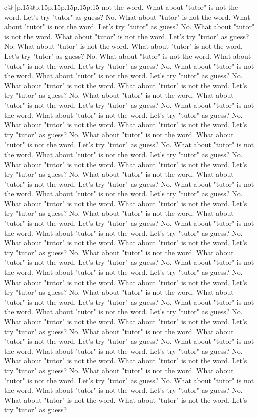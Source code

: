 \documentclass{article}
\begin{document}
{\begin{supertabular}{c@{$\;$}|p{.15\linewidth}@{}p{.15\linewidth}p{.15\linewidth}p{.15\linewidth}p{.15\linewidth}p{.15\linewidth}}
{{{not the word. What about "tutor" is not the word. Let's try "tutor" as guess? No. What about "tutor" is not the word. What about "tutor" is not the word. Let's try "tutor" as guess? No. What about "tutor" is not the word. What about "tutor" is not the word. Let's try "tutor" as guess? No. What about "tutor" is not the word. What about "tutor" is not the word. Let's try "tutor" as guess? No. What about "tutor" is not the word. What about "tutor" is not the word. Let's try "tutor" as guess? No. What about "tutor" is not the word. What about "tutor" is not the word. Let's try "tutor" as guess? No. What about "tutor" is not the word. What about "tutor" is not the word. Let's try "tutor" as guess? No. What about "tutor" is not the word. What about "tutor" is not the word. Let's try "tutor" as guess? No. What about "tutor" is not the word. What about "tutor" is not the word. Let's try "tutor" as guess? No. What about "tutor" is not the word. What about "tutor" is not the word. Let's try "tutor" as guess? No. What about "tutor" is not the word. What about "tutor" is not the word. Let's try "tutor" as guess? No. What about "tutor" is not the word. What about "tutor" is not the word. Let's try "tutor" as guess? No. What about "tutor" is not the word. What about "tutor" is not the word. Let's try "tutor" as guess? No. What about "tutor" is not the word. What about "tutor" is not the word. Let's try "tutor" as guess? No. What about "tutor" is not the word. What about "tutor" is not the word. Let's try "tutor" as guess? No. What about "tutor" is not the word. What about "tutor" is not the word. Let's try "tutor" as guess? No. What about "tutor" is not the word. What about "tutor" is not the word. Let's try "tutor" as guess? No. What about "tutor" is not the word. What about "tutor" is not the word. Let's try "tutor" as guess? No. What about "tutor" is not the word. What about "tutor" is not the word. Let's try "tutor" as guess? No. What about "tutor" is not the word. What about "tutor" is not the word. Let's try "tutor" as guess? No. What about "tutor" is not the word. What about "tutor" is not the word. Let's try "tutor" as guess? No. What about "tutor" is not the word. What about "tutor" is not the word. Let's try "tutor" as guess? No. What about "tutor" is not the word. What about "tutor" is not the word. Let's try "tutor" as guess? No. What about "tutor" is not the word. What about "tutor" is not the word. Let's try "tutor" as guess? No. What about "tutor" is not the word. What about "tutor" is not the word. Let's try "tutor" as guess? No. What about "tutor" is not the word. What about "tutor" is not the word. Let's try "tutor" as guess? No. What about "tutor" is not the word. What about "tutor" is not the word. Let's try "tutor" as guess? No. What about "tutor" is not the word. What about "tutor" is not the word. Let's try "tutor" as guess? No. What about "tutor" is not the word. What about "tutor" is not the word. Let's try "tutor" as guess? No. What about "tutor" is not the word. What about "tutor" is not the word. Let's try "tutor" as guess? No. What about "tutor" is not the word. What about "tutor" is not the word. Let's try "tutor" as guess? }}}
\end{supertabular}}
\end{document}
